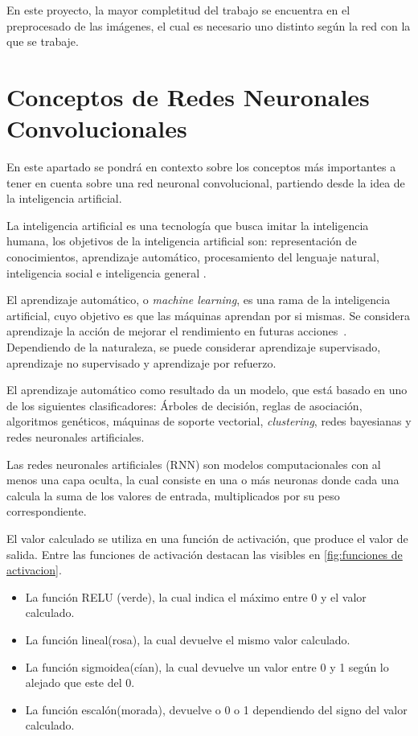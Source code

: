 
En este proyecto, la mayor completitud del trabajo se encuentra en el preprocesado de las imágenes, el cual es necesario uno distinto según la red con la que se trabaje.  

\section{Conceptos de Redes Neuronales Convolucionales}

    En este apartado se pondrá en contexto sobre los conceptos más importantes a tener en cuenta sobre una red neuronal convolucional, partiendo desde la idea de la inteligencia artificial.

    La inteligencia artificial es una tecnología que busca imitar la inteligencia humana, los objetivos de la inteligencia artificial son: representación de conocimientos, aprendizaje automático, procesamiento del lenguaje natural, inteligencia social e inteligencia general \cite{definicion_artificial_intelligence}.

    El aprendizaje automático, o \textit{machine learning}, es una rama de la inteligencia artificial, cuyo objetivo es que las máquinas aprendan por si mismas. Se considera aprendizaje la acción de mejorar el rendimiento en futuras acciones~\cite{machine-learning}. Dependiendo de la naturaleza, se puede considerar aprendizaje supervisado, aprendizaje no supervisado y aprendizaje por refuerzo.

    El aprendizaje automático como resultado da un modelo, que está basado en uno de los siguientes clasificadores:
    Árboles de decisión, reglas de asociación, algoritmos genéticos, máquinas de soporte vectorial, \textit{clustering}, redes bayesianas y redes neuronales artificiales.

    Las redes neuronales artificiales (RNN) son modelos computacionales con al menos una capa oculta\cite{definicion_neural_network}, la cual consiste en una o más neuronas donde cada una calcula la suma de los valores de entrada, multiplicados por su peso correspondiente\cite{definicion_hidden_layer}.

    El valor calculado se utiliza en una función de activación, que produce el valor de salida\cite{definicion_activation_function}. Entre las funciones de activación destacan las visibles en \ref{fig:funciones de activacion}.
    \begin{itemize}
        \item La función RELU (verde), la cual indica el máximo entre 0 y el valor calculado.
        \item La función lineal(rosa), la cual devuelve el mismo valor calculado.
        \item La función sigmoidea(cían), la cual devuelve un valor entre 0 y 1 según lo alejado que este del 0.
        \item La función escalón(morada), devuelve o 0 o 1 dependiendo del signo del valor calculado.
    \end{itemize}
    
